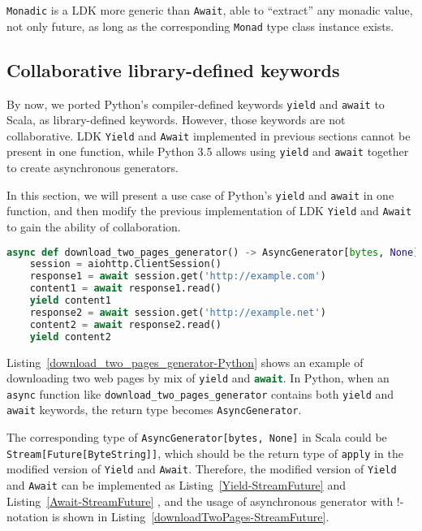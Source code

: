 \lstinline{Monadic} is a LDK more generic than \lstinline{Await}, able to ``extract'' any monadic value, not only future, as long as the corresponding \lstinline{Monad} type class instance exists.

\subsection{Collaborative library-defined keywords}\label{Collaborative library-defined keywords}

By now, we ported Python's compiler-defined keywords \lstinline{yield} and \lstinline{await} to Scala, as library-defined keywords. However, those keywords are not collaborative. LDK \lstinline{Yield} and \lstinline{Await} implemented in previous sections cannot be present in one function, while Python 3.5 allows using \lstinline{yield} and \lstinline{await} together to create asynchronous generators.

In this section, we will present a use case of Python's \lstinline{yield} and \lstinline{await} in one function, and then modify the previous implementation of LDK \lstinline{Yield} and \lstinline{Await} to gain the ability of collaboration.

\begin{lstlisting}[language=Python,style=Python3,caption={Downloading two web pages as an asynchronous generator in Python},label={download_two_pages_generator-Python}]
async def download_two_pages_generator() -> AsyncGenerator[bytes, None]:
    session = aiohttp.ClientSession()
    response1 = await session.get('http://example.com')
    content1 = await response1.read()
    yield content1
    response2 = await session.get('http://example.net')
    content2 = await response2.read()
    yield content2
\end{lstlisting}

Listing~\ref{download_two_pages_generator-Python} shows an example of downloading two web pages by mix of \lstinline{yield} and \lstinline[language=Python,style=Python3]{await}. In Python, when an \lstinline{async} function like \lstinline{download_two_pages_generator} contains both \lstinline{yield} and \lstinline{await} keywords, the return type becomes \lstinline{AsyncGenerator}.

The corresponding type of \lstinline{AsyncGenerator[bytes, None]} in Scala could be \lstinline{Stream[Future[ByteString]]}, which should be the return type of \lstinline{apply} in the modified version of \lstinline{Yield} and \lstinline{Await}. Therefore, the modified version of \lstinline{Yield} and \lstinline{Await} can be implemented as Listing~\ref{Yield-StreamFuture} and Listing~\ref{Await-StreamFuture} , and the usage of asynchronous generator with !-notation is shown in Listing~\ref{downloadTwoPages-StreamFuture}.

